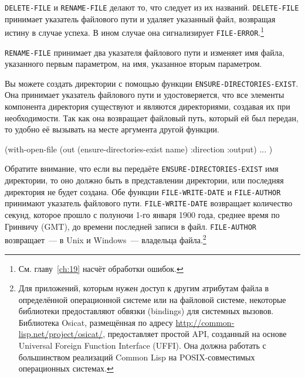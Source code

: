 \lstinline{DELETE-FILE} и \lstinline{RENAME-FILE} делают то, что следует из их
названий. \lstinline{DELETE-FILE} принимает указатель файлового пути и удаляет указанный файл,
возвращая истину в случае успеха. В ином случае она сигнализирует
\lstinline{FILE-ERROR}.\footnote{См. главу~\ref{ch:19} насчёт обработки ошибок.}

\lstinline{RENAME-FILE} принимает два указателя файлового пути и изменяет имя файла, указанного
первым параметром, на имя, указанное вторым параметром.

Вы можете создать директории с помощью функции \lstinline{ENSURE-DIRECTORIES-EXIST}. Она
принимает указатель файлового пути и удостоверяется, что все элементы компонента
директория существуют и являются директориями, создавая их при необходимости. Так как она
возвращает файловый путь, который ей был передан, то удобно её вызывать на месте аргумента
другой функции.

\begin{myverb}
(with-open-file (out (ensure-directories-exist name) :direction :output) 
   ... 
   ) 
\end{myverb}

Обратите внимание, что если вы передаёте \lstinline{ENSURE-DIRECTORIES-EXIST} имя директории,
то оно должно быть в представлении директории, или последняя директория не будет
создана. Обе функции \lstinline{FILE-WRITE-DATE} и \lstinline{FILE-AUTHOR} принимают указатель
файлового пути. \lstinline{FILE-WRITE-DATE} возвращает количество секунд, которое прошло с
полуночи 1-го января 1900 года, среднее время по Гринвичу (GMT), до времени последней
записи в файл. \lstinline{FILE-AUTHOR} возвращает~--- в Unix и Windows~--- владельца
файла.\footnote{Для приложений, которым нужен доступ к другим атрибутам файла в
  определённой операционной системе или на файловой системе, некоторые библиотеки
  предоставляют обвязки (bindings) для системных вызовов. Библиотека Osicat, размещённая
  по адресу \url{http://common-lisp.net/project/osicat/}, предоставляет простой API,
  созданный на основе Universal Foreign Function Interface (UFFI). Она должна работать с
  большинством реализаций Common Lisp на POSIX-совместимых операционных системах.}

